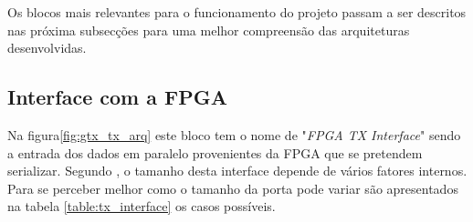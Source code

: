Os blocos mais relevantes para o funcionamento do projeto passam a ser descritos nas próxima subsecções para uma melhor compreensão das arquiteturas desenvolvidas.

\subsection{Interface com a FPGA} \label{subch:tx_interface}

Na figura\ref{fig:gtx_tx_arq} este bloco tem o nome de "\textit{FPGA TX Interface}" sendo a entrada dos dados em paralelo provenientes da FPGA que se pretendem serializar. Segundo \cite{R011}, o tamanho desta interface depende de vários fatores internos. Para se perceber melhor como o tamanho da porta pode variar são apresentados na tabela \ref{table:tx_interface} os casos possíveis.


